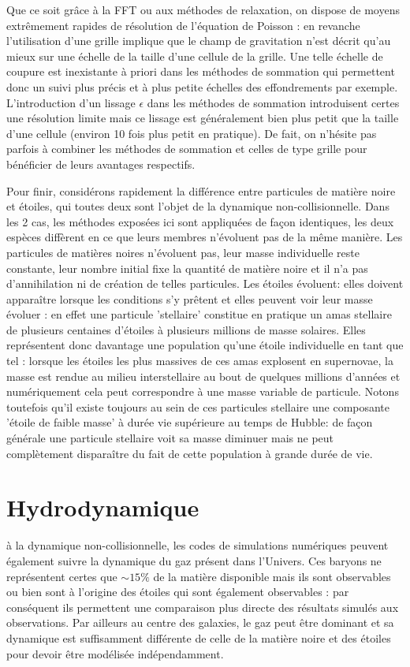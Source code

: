 Que ce soit grâce à la FFT ou aux méthodes de relaxation, on dispose de moyens extrêmement rapides de résolution de l'équation de Poisson : en revanche l'utilisation d'une grille implique que le champ de gravitation n'est décrit qu'au mieux sur une échelle de la taille d'une cellule de la grille. Une telle échelle de coupure est inexistante à priori dans les méthodes de sommation qui permettent donc un suivi plus précis et à plus petite échelles des effondrements par exemple. L'introduction d'un lissage $\epsilon$ dans les méthodes de sommation introduisent certes une résolution limite mais ce lissage est généralement bien plus petit que la taille d'une cellule (environ 10 fois plus petit en pratique). De fait, on n'hésite pas parfois à combiner les méthodes de sommation et celles de type grille pour bénéficier de leurs avantages respectifs.

Pour finir, considérons rapidement la différence entre particules de matière noire et étoiles, qui toutes deux sont l'objet de la dynamique non-collisionnelle. Dans les 2 cas, les méthodes exposées ici sont appliquées de façon identiques, les deux espèces diffèrent en ce que leurs membres n'évoluent pas de la même manière. Les particules de matières noires n'évoluent pas, leur masse individuelle reste constante, leur nombre initial fixe la quantité de matière noire et il n'a pas d'annihilation ni de création de telles particules. Les étoiles évoluent: elles doivent apparaître lorsque les conditions s'y prêtent et elles peuvent voir leur masse évoluer : en effet une particule 'stellaire' constitue en pratique un amas stellaire  de plusieurs centaines d'étoiles à plusieurs millions de masse solaires. Elles représentent donc davantage une population qu'une étoile individuelle en tant que tel : lorsque les étoiles les plus massives de ces amas explosent en supernovae, la masse est rendue au milieu interstellaire au bout de quelques millions d'années et numériquement cela peut correspondre à une masse variable de particule. Notons toutefois qu'il existe toujours au sein de ces particules stellaire une composante 'étoile de faible masse' à durée vie supérieure au temps de Hubble: de façon générale une particule stellaire voit sa masse diminuer mais ne peut complètement disparaître du fait de cette population à grande durée de vie.

\section{Hydrodynamique}
 à la dynamique non-collisionnelle, les codes de simulations numériques peuvent également suivre la dynamique du gaz présent dans l'Univers. Ces baryons ne représentent certes que $\sim 15\%$ de la matière disponible mais ils sont observables ou bien sont à l'origine des étoiles qui sont également observables : par conséquent ils permettent une comparaison plus directe des résultats simulés aux observations. Par ailleurs au centre des galaxies, le gaz peut être dominant et sa dynamique est suffisamment différente de celle de la matière noire et des étoiles pour devoir être modélisée indépendamment.

